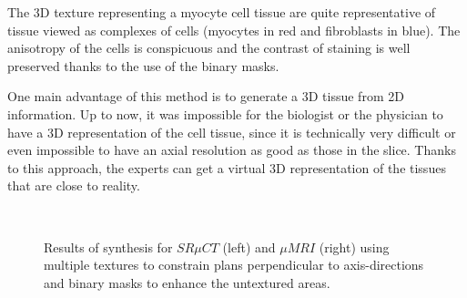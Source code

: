 The 3D texture representing a myocyte cell tissue are quite representative of tissue viewed as complexes of cells (myocytes in red and fibroblasts in blue).
The anisotropy of the cells is conspicuous and the contrast of staining is well preserved thanks to the use of the binary masks. 

One main advantage of this method is to generate a 3D tissue from 2D information. 
Up to now, it was impossible for the biologist or the physician to have a 3D representation 
of the cell tissue, since it is technically very difficult or even impossible to have 
an axial resolution as good as those in the slice. 
Thanks to this approach, the experts can get a virtual 3D representation of the tissues 
that are close to reality.


\begin{figure}[h!] 
 \centering
 \\
 \caption[$SR \mu{CT}$ and $\mu{MRI}$ synthesis.]{Results of synthesis for $SR \mu{CT}$ (left) and $\mu{MRI}$ (right) using multiple textures to constrain plans perpendicular to axis-directions and binary masks to enhance the untextured areas.
         }
 \label{fig:ResultVolumesMRI_CT} 
\end{figure}

